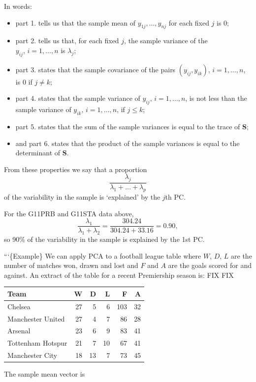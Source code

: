 \documentclass[]{book}
\theoremstyle{definition}
\theoremstyle{definition}
\theoremstyle{definition}
\theoremstyle{remark}
\begin{document}
In words:

\begin{itemize}
\item
  part 1. tells us that the sample mean of \(y_{1j}, \ldots , y_{nj}\) for each fixed \(j\) is \(0\);
\item
  part 2. tells us that, for each fixed \(j\), the sample variance of
  the \(y_{ij},\, i=1, \ldots , n\) is \(\lambda_j\);
\item
  part 3. states that the sample covariance of the pairs \((y_{ij}, y_{ik})\), \(i=1, \ldots , n\), is \(0\) if \(j \neq k\);
\item
  part 4. states that the sample variance of \(y_{ij}, \, i=1, \ldots , n\), is not less than the sample variance of \(y_{ik}, \, i=1, \ldots , n\), if \(j\leq k\);
\item
  part 5. states that the sum of the sample variances is equal to the trace of \(\boldsymbol S\);
\item
  and part 6. states that the product of the sample variances is equal to the determinant of \(\boldsymbol S\).
\end{itemize}

From these properties we say that a proportion
\[\frac{\lambda_j}{\lambda_1 + \ldots + \lambda_p}\]
of the variability in the sample is `explained' by the \(j\)th PC.

For the G11PRB and G11STA data above,
\[\frac{\lambda_1}{\lambda_1 + \lambda_2} = \frac{304.24}{304.24+33.16} = 0.90,\]
so 90\% of the variability in the sample is explained by the 1st PC.

```\{Example\} We can apply PCA to a football league table where \(W\), \(D\), \(L\) are the number of matches won, drawn and lost and \(F\) and \(A\) are the goals scored for and against. An extract of the table for a recent Premiership season is:
FIX FIX

\begin{tabular}{lrrrrr}
\toprule
Team & W & D & L & F & A\\
\midrule
Chelsea & 27 & 5 & 6 & 103 & 32\\
Manchester United & 27 & 4 & 7 & 86 & 28\\
Arsenal & 23 & 6 & 9 & 83 & 41\\
Tottenham Hotspur & 21 & 7 & 10 & 67 & 41\\
Manchester City & 18 & 13 & 7 & 73 & 45\\
\bottomrule
\end{tabular}

The sample mean vector is
\end{document}
